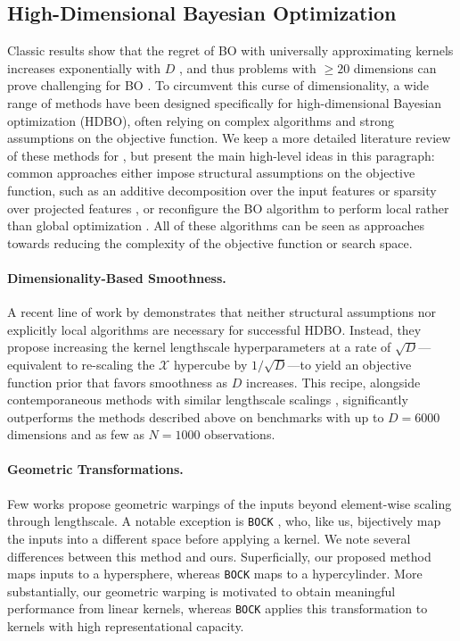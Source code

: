 \documentclass[twoside]{article}
\theoremstyle{plain}
\theoremstyle{definition}
\begin{document}
\subsection{High-Dimensional Bayesian Optimization} \label{sec:high-dim-BO}
Classic results show that the regret of BO with universally approximating kernels increases exponentially with $D$ \citep{srinivas2010gaussian, bull2011convergence},
and thus problems with $\geq 20$ dimensions can prove challenging for BO \citep{frazier2018bayesian}.
To circumvent this curse of dimensionality, a wide range of methods have been designed specifically for high-dimensional Bayesian optimization (HDBO), often relying on complex algorithms and strong assumptions on the objective function. We keep a more detailed literature review of these methods for , but present the main high-level ideas in this paragraph:
common approaches either impose structural assumptions on the objective function,
such as an additive decomposition over the input features \citep[e.g.][]{kandasamy2015high} or sparsity over projected features \citep[e.g.][]{papenmeier2023bounce},
or reconfigure the BO algorithm to perform local rather than global optimization \citep[e.g.][]{eriksson2019scalable}.
All of these algorithms can be seen as approaches towards reducing the complexity of the objective function or search space.

\paragraph{Dimensionality-Based Smoothness.} A recent line of work by \citet{hvarfner2024vanilla} demonstrates that neither structural assumptions nor explicitly local algorithms are necessary for successful HDBO.
Instead, they propose increasing the kernel lengthscale hyperparameters at a rate of $\sqrt D$---equivalent to re-scaling the $\mathcal X$ hypercube by $1/\sqrt{D}$---to yield an objective function prior that favors smoothness as $D$ increases.
This  recipe,
alongside contemporaneous methods with similar lengthscale scalings \citep{xu2025standard,papenmeier2025understanding},
significantly outperforms the methods described above
on benchmarks with up to $D=6000$ dimensions and as few as $N = 1000$ observations.

\paragraph{Geometric Transformations.} Few works propose geometric warpings of the inputs beyond element-wise scaling through lengthscale.
A notable exception is \texttt{BOCK} \citep{oh2018bock}, 
who, like us, bijectively map the inputs into a different space before applying a kernel.
We note several differences between this method and ours.
Superficially, our proposed method maps inputs to a hypersphere, whereas \texttt{BOCK} maps to a hypercylinder.
More substantially, our geometric warping is motivated to obtain meaningful performance from linear kernels, whereas \texttt{BOCK} applies this transformation to kernels with high representational capacity.
\end{document}
